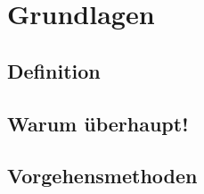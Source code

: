 \section{Grundlagen}

\subsection{Definition}
\vfill

\subsection{Warum überhaupt!}
\vfill

\subsection{Vorgehensmethoden}